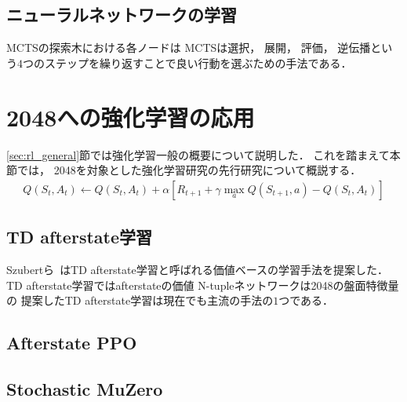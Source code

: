 \subsection{ニューラルネットワークの学習}
MCTSの探索木における各ノードは
MCTSは選択， 展開， 評価， 逆伝播という$4$つのステップを繰り返すことで良い行動を選ぶための手法である．

\section{2048への強化学習の応用}
\ref{sec:rl_general}節では強化学習一般の概要について説明した．
これを踏まえて本節では， 2048を対象とした強化学習研究の先行研究について概説する．
\begin{align}
  \label{eq:td_afterstate}
  Q(S_t, A_t) \leftarrow Q(S_t, A_t) + \alpha [R_{t+1} + \gamma \max_a Q(S_{t+1}, a) - Q(S_t, A_t)]
\end{align}


\subsection{TD afterstate学習}
Szubertら~\cite{Szubert}はTD afterstate学習と呼ばれる価値ベースの学習手法を提案した．
TD afterstate学習ではafterstateの価値
N-tupleネットワークは2048の盤面特徴量の
提案したTD afterstate学習は現在でも主流の手法の$1$つである．


\subsection{Afterstate PPO}

\subsection{Stochastic MuZero}
